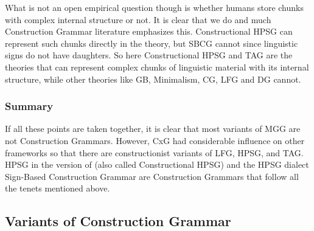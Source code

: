 \documentclass[output=paper]{langsci/langscibook}
\begin{document}
What is not an open empirical question though is whether humans store chunks with complex internal
structure or not. It is clear that we do and much Construction Grammar literature emphasizes
this. Constructional HPSG can represent such chunks directly in the theory, but SBCG cannot since
linguistic signs do not have daughters. So here Constructional HPSG and TAG are the theories that
can represent complex chunks of linguistic material with its internal structure, while other
theories like GB, Minimalism, CG, LFG and DG cannot.

\subsubsection{Summary}

If all these points are taken together, it is clear that most variants of MGG are not Construction
Grammars. However, CxG had considerable influence on other frameworks so that there are
constructionist variants of LFG, HPSG, and TAG. HPSG in the version of \citet{Sag97a} (also called
Constructional HPSG) and the HPSG dialect Sign-Based Construction Grammar are Construction Grammars
that follow all the tenets mentioned above.


\subsection{Variants of Construction Grammar}
\end{document}
